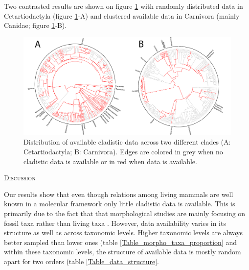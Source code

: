 \documentclass[12pt,letterpaper]{article}
\renewcommand{\section}[1]{%
\bigskip
\begin{center}
\begin{Large}
\normalfont\scshape #1
\medskip
\end{Large}
\end{center}}
\renewcommand{\subsection}[1]{%
\bigskip
\begin{center}
\begin{large}
\normalfont\itshape #1
\end{large}
\end{center}}
\begin{document}
Two contrasted results are shown on figure \ref{Figure_example_coverage} with randomly distributed data in Cetartiodactyla (figure \ref{Figure_example_coverage}-A) and clustered available data in Carnivora (mainly Canidae; figure \ref{Figure_example_coverage}-B).

\begin{figure}[!htbp]
\centering
    \includegraphics[width=1\textwidth]{example_coverage.pdf}
\caption{Distribution of available cladistic data across two different clades (A: Cetartiodactyla; B: Carnivora).
Edges are colored in grey when no cladistic data is available or in red when data is available.}
\label{Figure_example_coverage}
\end{figure}




%
%

\section{Discussion}
Our results show that even though relations among living mammals are well known in a molecular framework \citep[e.g.][]{FritzTree,meredithimpacts2011,May-Collado-PeerJ} only little cladistic data is available.
This is primarily due to the fact that that morphological studies are mainly focusing on fossil taxa rather than living taxa \citep[e.g.][]{O'Leary08022013,ni2013oldest}.
However, data availability varies in its structure as well as across taxonomic levels.
Higher taxonomic levels are always better sampled than lower ones (table \ref{Table_morpho_taxa_proportion} and within these taxonomic levels, the structure of available data is mostly random apart for two orders (table \ref{Table_data_structure}.
\end{document}
